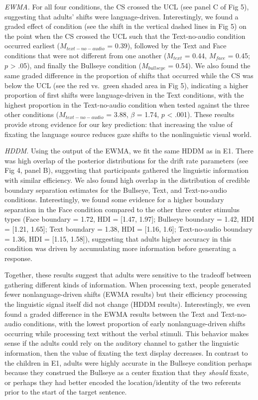 \documentclass[10pt, letterpaper]{article}
\begin{document}
\emph{EWMA.} For all four conditions, the CS crossed the UCL (see panel
C of Fig 5), suggesting that adults' shifts were language-driven.
Interestingly, we found a graded effect of condition (see the shift in
the vertical dashed lines in Fig 5) on the point when the CS crossed the
UCL such that the Text-no-audio condition occurred earliest
(\(M_{text-no-audio}\) = 0.39), followed by the Text and Face conditions
that were not different from one another (\(M_{text}\) = 0.44,
\(M_{face}\) = 0.45; \(p\) \textgreater{} .05), and finally the Bullseye
condition (\(M_{bullseye}\) = 0.54). We also found the same graded
difference in the proportion of shifts that occurred while the CS was
below the UCL (see the red vs.~green shaded area in Fig 5), indicating a
higher proportion of first shifts were language-driven in the Text
conditions, with the highest proportion in the Text-no-audio condition
when tested against the three other conditions (\(M_{text-no-audio}\) =
3.88, \(\beta\) = 1.74, \(p\) \textless{} .001). These results provide
strong evidence for our key prediction: that increasing the value of
fixating the language source reduces gaze shifts to the nonlinguistic
visual world.

\emph{HDDM.} Using the output of the EWMA, we fit the same HDDM as in
E1. There was high overlap of the posterior distributions for the drift
rate parameters (see Fig 4, panel B), suggesting that participants
gathered the linguistic information with similar efficiency. We also
found high overlap in the distribution of credible boundary separation
estimates for the Bullseye, Text, and Text-no-audio conditions.
Interestingly, we found some evidence for a higher boundary separation
in the Face condition compared to the other three center stimulus types
(Face boundary = 1.72, HDI = {[}1.47, 1.97{]}; Bullseye boundary = 1.42,
HDI = {[}1.21, 1.65{]}; Text boundary = 1.38, HDI = {[}1.16, 1.6{]};
Text-no-audio boundary = 1.36, HDI = {[}1.15, 1.58{]}), suggesting that
adults higher accuracy in this condition was driven by accumulating more
information before generating a response.

Together, these results suggest that adults were sensitive to the
tradeoff between gathering different kinds of information. When
processing text, people generated fewer nonlanguage-driven shifts (EWMA
results) but their efficiency processing the linguistic signal itself
did not change (HDDM results). Interestingly, we even found a graded
difference in the EWMA results between the Text and Text-no-audio
conditions, with the lowest proportion of early nonlanguage-driven
shifts occurring while processing text without the verbal stimuli. This
behavior makes sense if the adults could rely on the auditory channel to
gather the linguistic information, then the value of fixating the text
display decreases. In contrast to the children in E1, adults were highly
accurate in the Bullseye condition perhaps because they construed the
Bullseye as a center fixation that they \emph{should} fixate, or perhaps
they had better encoded the location/identity of the two referents prior
to the start of the target sentence.
\end{document}
